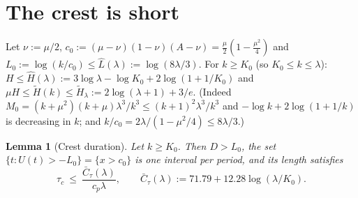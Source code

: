 \documentclass[11pt,a4paper]{article}
\newtheorem{lemma}[theorem]{Lemma}
\theoremstyle{remark}\newtheorem{remark}[theorem]{Remark}
\begin{document}
\section{The crest is short}
Let $\nu:=\mu/2$, $c_0:=(\mu-\nu)(1-\nu)(A-\nu)=\tfrac\mu2(1-\tfrac{\mu^2}4)$ and
$L_0:=\log(k/c_0)\le\hat L(\lambda):=\log(8\lambda/3)$. For $k\ge K_0$ (so $K_0\le k\le\lambda$):
$H\le\hat H(\lambda):=3\log\lambda-\log K_0+2\log(1+1/K_0)$ and
$\mu H\le\tilde H(k)\le\tilde H_\lambda:=2\log(\lambda+1)+3/e$. (Indeed
$M_0=(k+\mu^2)(k+\mu)\lambda^3/k^3\le(k+1)^2\lambda^3/k^3$ and $-\log k+2\log(1+1/k)$ is decreasing in
$k$; and $k/c_0=2\lambda/(1-\mu^2/4)\le8\lambda/3$.)

\begin{lemma}[Crest duration]\label{lem:crest}
Let $k\ge K_0$. Then $D>L_0$, the set $\{t:U(t)>-L_0\}=\{x>c_0\}$ is one interval per period, and
its length satisfies
\[
\tau_c\ \le\ \frac{\bar C_\tau(\lambda)}{c_p\lambda},\qquad \bar C_\tau(\lambda):=71.79+12.28\log(\lambda/K_0).
\]
\end{lemma}
\end{document}
